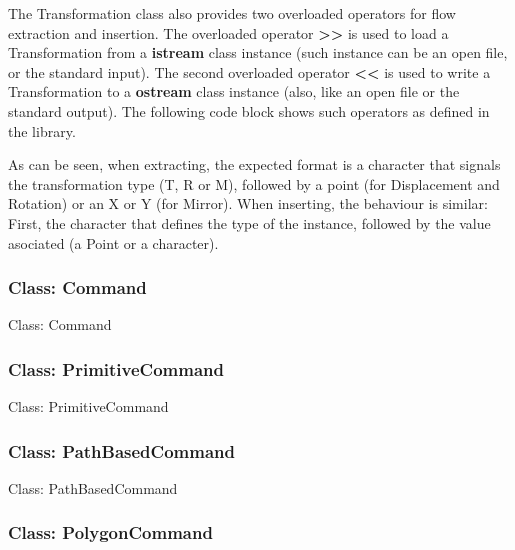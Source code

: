\documentclass[11pt,twoside,openany,x11names,svgnames]{memoir}
\begin{document}
The Transformation class also provides two overloaded operators for flow extraction and insertion. The overloaded operator \textbf{>>} is used to load a Transformation from a \textbf{istream} class instance (such instance can be an open file, or the standard input). The second overloaded operator \textbf{<<} is used to write a Transformation to a \textbf{ostream} class instance (also, like an open file or the standard output). The following code block shows such operators as defined in the library.



As can be seen, when extracting, the expected format is a character that signals the transformation type (T, R or M), followed by a point (for Displacement and Rotation) or an X or Y (for Mirror). When inserting, the behaviour is similar: First, the character that defines the type of the instance, followed by the value asociated (a Point or a character).

\subsubsection{Class: Command}\label{Class-Command}

Class: Command

\subsubsection{Class: PrimitiveCommand}\label{Class-PrimitiveCommand}

Class: PrimitiveCommand

\subsubsection{Class: PathBasedCommand}\label{Class-PathBasedCommand}

Class: PathBasedCommand

\subsubsection{Class: PolygonCommand}\label{Class-PolygonCommand}
\end{document}
